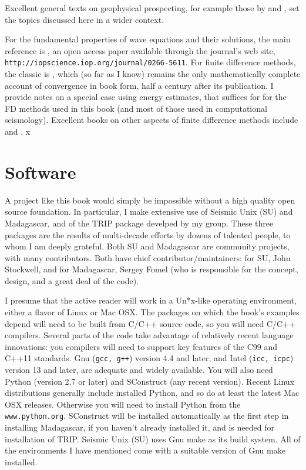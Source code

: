 Excellent general texts on geophysical prospecting, for example those by \cite{Yil:01} and \cite{DobSav:88}, set the topics discussed here in a wider context. 

For the fundamental properties of wave equations and their solutions, the main reference is \cite{BlazekStolkSymes:13}, an open access paper available through the journal's web site, {\tt http://iopscience.iop.org/journal/0266-5611}. For finite difference methods, the classic is \cite{RichtMort}, which (so far as I know) remains the only mathematically complete account of convergence in book form, half a century after its publication. I provide notes on a special case using energy estimates, that suffices for for the FD methods used in this book (and most of those used in computational seismology). Excellent books on other aspects of finite difference methods include \cite{Cohen:01} and \cite{Leveque:07}. x

\section{Software} 
A project like this book would simply be impossible without a high quality open source foundation. In particular, I make extensive use of Seismic Unix (SU) and Madagascar, and of the TRIP package develped by my group. These three packages are the results of multi-decade efforts by dozens of talented people, to whom I am deeply grateful. Both SU and Madagascar are community projects, with many contributors. Both have chief contributor/maintainers: for SU, John Stockwell, and for Madagascar, Sergey Fomel (who is responsible for the concept, design, and a great deal of the code).

I presume that the active reader will work in a Un*x-like operating environment, either a flavor of Linux or Mac OSX. The packages on which the book's examples depend will need to be built from C/C++ source code, so you will need C/C++ compilers. Several parts of the code take advantage of relatively recent language innovations: you compilers will need to support key features of the C99 and C++11 standards. Gnu ({\tt gcc, g++}) version 4.4 and later, and Intel ({\tt icc, icpc}) version 13 and later, are adequate and widely available. You will also need Python (version 2.7 or later) and SConstruct (any recent version). Recent Linux distributions generally include installed Python, and so do at least the latest Mac OSX releases. Otherwise you will need to install Python from the {\tt www.python.org}. SConstruct will be installed automatically as the first step in installing Madagascar, if you haven't already installed it, and is needed for installation of TRIP. Seismic Unix (SU) uses Gnu make as its build system. All of the environments I have mentioned come with a suitable version of Gnu make installed.

